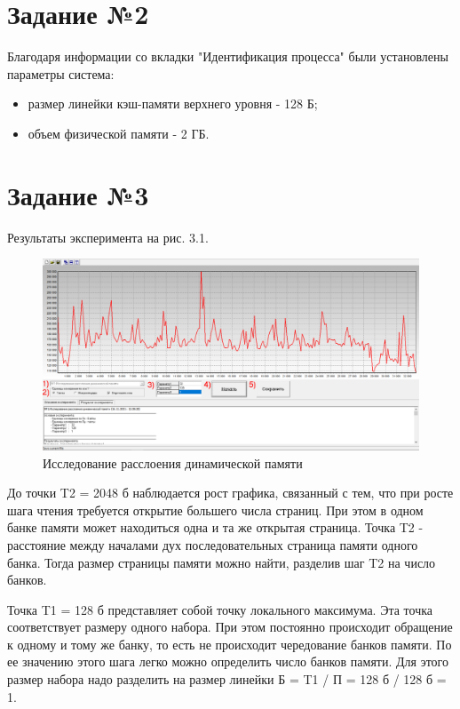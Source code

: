 \chapter{Задание №2}

Благодаря информации со вкладки "Идентификация процесса" были установлены параметры система:
\begin{itemize}
	\item размер линейки кэш-памяти верхнего уровня - 128 Б;
	\item объем физической памяти - 2 ГБ.
\end{itemize}

\chapter{Задание №3}

Результаты эксперимента на рис. 3.1.

\begin{figure}[H]
	\begin{center}
		\includegraphics[scale=0.5]{assets/task3.png}
	\end{center}
	\caption{Исследование расслоения динамической памяти}
\end{figure}

До точки T2 = 2048 б наблюдается рост графика, связанный с тем, что при росте шага чтения требуется открытие большего числа страниц. При этом в одном банке памяти может находиться одна и та же открытая страница. Точка T2 - расстояние между началами дух последовательных страница памяти одного банка. Тогда размер страницы памяти можно найти, разделив шаг T2 на число банков.

Точка T1 = 128 б представляет собой точку локального максимума. Эта точка соответствует размеру одного набора. При этом постоянно происходит обращение к одному и тому же банку, то есть не происходит чередование банков памяти. По ее значению этого шага легко можно определить число банков памяти. Для этого размер набора надо разделить на размер линейки Б = T1 / П = 128 б / 128 б = 1.

